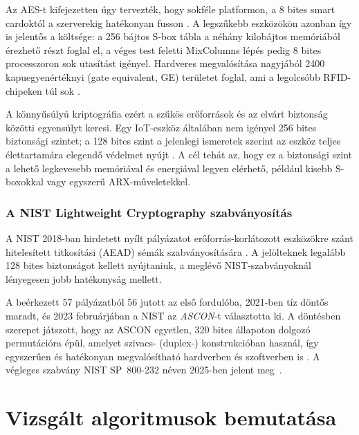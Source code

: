 \documentclass[a4paper,12pt]{report}
\theoremstyle{definition}
\theoremstyle{remark}
\begin{document}
Az AES-t kifejezetten úgy tervezték, hogy sokféle platformon, a 8 bites smart cardoktól a szerverekig hatékonyan fusson \cite{DaemenRijmen2002}. A legszűkebb eszközökön azonban így is jelentős a költsége: a 256 bájtos S-box tábla a néhány kilobájtos memóriából érezhető részt foglal el, a véges test feletti MixColumns lépés pedig 8 bites processzoron sok utasítást igényel. Hardveres megvalósítása nagyjából 2400 kapuegyenértéknyi (gate equivalent, GE) területet foglal, ami a legolcsóbb RFID-chipeken túl sok \cite{NISTIR8114}.

A könnyűsúlyú kriptográfia ezért a szűkös erőforrások és az elvárt biztonság közötti egyensúlyt keresi. Egy IoT-eszköz általában nem igényel 256 bites biztonsági szintet; a 128 bites szint a jelenlegi ismeretek szerint az eszköz teljes élettartamára elegendő védelmet nyújt \cite{Biryukov2017}. A cél tehát az, hogy ez a biztonsági szint a lehető legkevesebb memóriával és energiával legyen elérhető, például kisebb S-boxokkal vagy egyszerű ARX-műveletekkel.

\subsection{A NIST Lightweight Cryptography szabványosítás}

A NIST 2018-ban hirdetett nyílt pályázatot erőforrás-korlátozott eszközökre szánt hitelesített titkosítási (AEAD) sémák szabványosítására \cite{NISTLWC2023}. A jelölteknek legalább 128 bites biztonságot kellett nyújtaniuk, a meglévő NIST-szabványoknál lényegesen jobb hatékonyság mellett.

A beérkezett 57 pályázatból 56 jutott az első fordulóba, 2021-ben tíz döntős maradt, és 2023 februárjában a NIST az \emph{ASCON}-t választotta ki. A döntésben szerepet játszott, hogy az ASCON egyetlen, 320 bites állapoton dolgozó permutációra épül, amelyet szivacs- (duplex-) konstrukcióban használ, így egyszerűen és hatékonyan megvalósítható hardverben és szoftverben is \cite{Dobraunig2021}. A végleges szabvány NIST SP~800-232 néven 2025-ben jelent meg~\cite{NISTSP800232}.

\chapter{Vizsgált algoritmusok bemutatása}\label{chap:algoritmusok}
\end{document}
